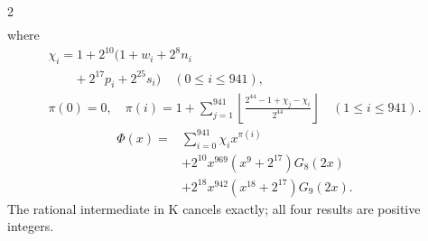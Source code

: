 \documentclass[10pt]{article}
\newcommand{\fl}[1]{\left\lfloor#1\right\rfloor}
\begin{document}
\begin{multicols}{2}
\begin{align*}
\end{align*}
where
\[
\begin{gathered}
\chi_i=1+2^{10}(1+w_i+2^8n_i\\
\qquad+2^{17}p_i+2^{25}s_i)\quad(0\le i\le941),\\
\pi(0)=0,\quad\pi(i)=1+\sum_{j=1}^{941}
\fl{\frac{2^{44}-1+\chi_j-\chi_i}{2^{44}}}\quad(1\le i\le941).
\end{gathered}
\]
\[
\begin{split}
\Phi(x)={}&\sum_{i=0}^{941}\chi_i x^{\pi(i)}\\
&+2^{10}x^{969}(x^9+2^{17})G_8(2x)\\
&+2^{18}x^{942}(x^{18}+2^{17})G_9(2x).
\end{split}
\]
The rational intermediate in K cancels exactly; all four results are positive integers.


\end{multicols}
\end{document}
